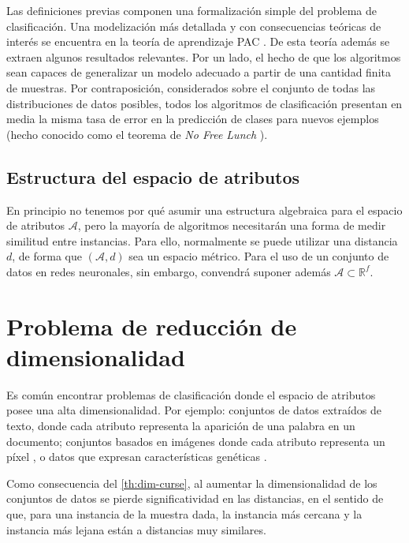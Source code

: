 Las definiciones previas componen una formalización simple del problema
de clasificación. Una modelización más detallada y con consecuencias
teóricas de interés se encuentra en la teoría de aprendizaje PAC
\autocite{shwartz2014}. De esta teoría además se extraen algunos resultados
relevantes. Por un lado, el hecho de que los algoritmos sean capaces de generalizar
un modelo adecuado a partir de una cantidad finita de muestras. Por contraposición,
considerados sobre el conjunto de todas las distribuciones de datos
posibles, todos los algoritmos de clasificación presentan en media la
misma tasa de error en la predicción de clases para nuevos ejemplos
(hecho conocido como el teorema de \textit{No Free Lunch} \autocite{wolpert1997}).

\subsection{Estructura del espacio de
atributos}\label{estructura-del-espacio-de-atributos}

En principio no tenemos por qué asumir una estructura algebraica para el
espacio de atributos \(\mathcal A\), pero la mayoría de algoritmos
necesitarán una forma de medir similitud entre instancias. Para ello,
normalmente se puede utilizar una distancia \(d\), de forma que
\((\mathcal A,d)\) sea un espacio métrico. Para el uso de un conjunto de
datos en redes neuronales, sin embargo, convendrá suponer además
\(\mathcal A\subset \mathbb R^f\).

\section{Problema de reducción de
dimensionalidad}\label{sec:red-dim}

Es común encontrar problemas de clasificación donde el espacio de
atributos posee una alta dimensionalidad. Por ejemplo: conjuntos de
datos extraídos de texto, donde cada atributo representa la aparición de
una palabra en un documento; conjuntos basados en imágenes donde cada
atributo representa un píxel \autocite{mnist}, o datos que
expresan características genéticas \autocite{clarke2008}.

Como consecuencia del \autoref{th:dim-curse}, al aumentar la dimensionalidad de los conjuntos de datos se pierde significatividad en las distancias, en el sentido de que, para una instancia de la muestra dada, la instancia más cercana y la instancia más lejana están a distancias muy similares.

